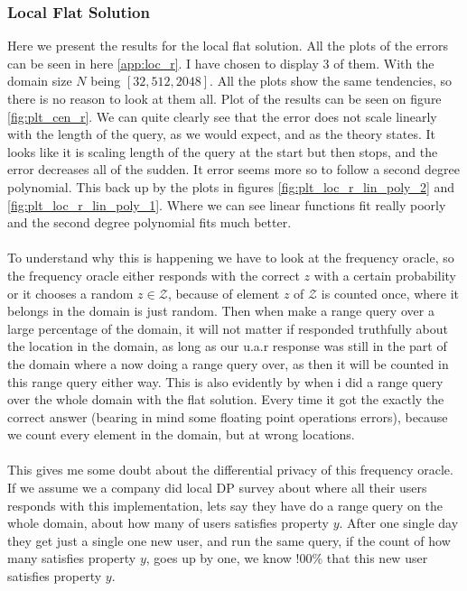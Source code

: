 \documentclass[11pt]{article}
\theoremstyle{definition}
\begin{document}
\subsubsection{Local Flat Solution}
Here we present the results for the local flat solution. All the plots of the errors can be seen in here \ref{app:loc_r}. I have chosen to display 3 of them. With the domain size $N$ being $[32,512,2048]$. All the plots show the same tendencies, so there is no reason to look at them all. Plot of the results can be seen on figure \ref{fig:plt_cen_r}. We can quite clearly see that the error does not scale linearly with the length of the query, as we would expect, and as the theory states. It looks like it is scaling length of the query at the start but then stops, and the error decreases all of the sudden. It error seems more so to follow a second degree polynomial. This back up by the plots in figures \ref{fig:plt_loc_r_lin_poly_2} and \ref{fig:plt_loc_r_lin_poly_1}. Where we can see linear functions fit really poorly and the second degree polynomial fits much better. \\ \\ 
To understand why this is happening we have to look at the frequency oracle, so the frequency oracle either responds with the correct $z$ with a certain probability or it chooses a random $z\in\mathcal{Z}$, because of element $z$ of $\mathcal{Z}$ is counted once, where it belongs in the domain is just random. Then when make a range query over a large percentage of the domain, it will not matter if responded truthfully about the location in the domain, as long as our u.a.r response was still in the part of the domain where a now doing a range query over, as then it will be counted in this range query either way. This is also evidently by when i did a range query over the whole domain with the flat solution. Every time it got the exactly the correct answer (bearing in mind some floating point operations errors), because we count every element in the domain, but at wrong locations.\\ \\
This gives me some doubt about the differential privacy of this frequency oracle. If we assume we a company did local DP survey about where all their users responds with this implementation, lets say they have do a range query on the whole domain, about how many of users satisfies property $y$. After one single day they get just a single one new user, and run the same query, if the count of how many satisfies property $y$, goes up by one, we know !00\% that this new user satisfies property $y$.
\end{document}
